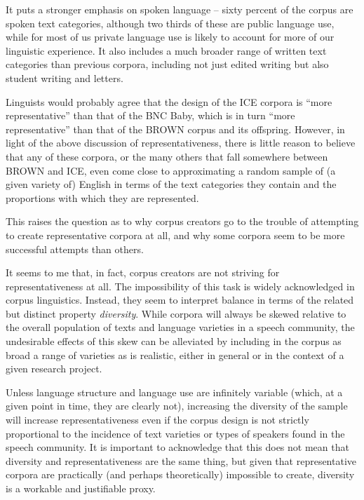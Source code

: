 It puts a stronger emphasis on spoken language -- sixty percent of the corpus are spoken  text categories, although two thirds of these are public language use, while for most of us private language use is likely to account for more of our linguistic experience. It also includes a much broader range of written  text categories than previous corpora, including not just edited writing but also student writing and letters.

Linguists would probably agree that the design  of the ICE  corpora is ``more representative'' than that of the BNC Baby,  which is in turn ``more representative'' than that of the BROWN  corpus and its offspring. However, in light of the above discussion of representativeness,  there is little reason to believe that any of these corpora, or the many others that fall somewhere between BROWN  and ICE,  even come close to approximating a random  sample  of (a given variety  of) English in terms of the text categories they contain and the proportions with which they are represented.\largerpage

This raises the question as to why corpus creators go to the trouble of attempting to create representative corpora at all, and why some corpora seem to be more successful attempts than others.

It seems to me that, in fact, corpus creators are not striving for representativeness at all. The impossibility of this task is widely acknowledged in corpus linguistics. Instead, they seem to interpret balance in terms of the related but distinct property \emph{diversity}. While corpora will always be skewed relative to the overall population of texts and language varieties  in a speech community, the undesirable effects of this skew can be alleviated by including in the corpus as broad a range of varieties as is realistic, either in general or in the context of a given research project.\largerpage

Unless language structure and language use are infinitely variable (which, at a given point in time, they are clearly not), increasing the diversity of the sample  will increase representativeness  even if the corpus design  is not strictly proportional to the incidence of text varieties or types of speakers found in the speech community. It is important to acknowledge that this does not mean that diversity and representativeness are the same thing, but given that representative corpora are practically (and perhaps theoretically) impossible to create, diversity is a workable and justifiable proxy.

